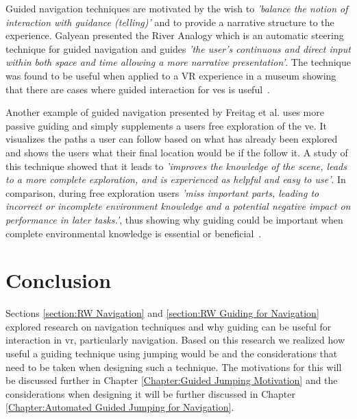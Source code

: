 Guided navigation techniques are motivated by the wish to \textit{'balance the notion of interaction with guidance (telling)'} and to provide a narrative structure to the experience. Galyean presented the River Analogy which is an automatic steering technique for guided navigation and guides \textit{'the user’s continuous and direct input within both space and time allowing a more narrative presentation'}. The technique was found to be useful when applied to a VR experience in a museum showing that there are cases where guided interaction for \acrshort{ve}s is useful~\cite{Galyean1995}.

Another example of guided navigation presented by Freitag et al. uses more passive guiding and simply supplements a users free exploration of the \acrshort{ve}. It visualizes the paths a user can follow based on what has already been explored and shows the users what their final location would be if the follow it. A study of this technique showed that it leads to \textit{'improves the knowledge of the scene, leads to a more complete exploration, and is experienced as helpful and easy to use'}. In comparison, during free exploration users \textit{'miss important parts, leading to incorrect or incomplete environment knowledge and a potential negative impact on performance in later tasks.'}, thus showing why guiding could be important when complete environmental knowledge is essential or beneficial~\cite{Freitag2018}.

\section{Conclusion}
\label{section:RW Conclusion}
Sections \ref{section:RW Navigation} and \ref{section:RW Guiding for Navigation} explored research on navigation techniques and why guiding can be useful for interaction in \acrshort{vr}, particularly navigation. Based on this research we realized how useful a guiding technique using jumping would be and the considerations that need to be taken when designing such a technique. The motivations for this will be discussed further in Chapter \ref{Chapter:Guided Jumping Motivation} and the considerations when designing it will be further discussed in Chapter \ref{Chapter:Automated Guided Jumping for Navigation}.